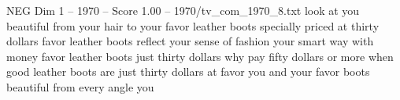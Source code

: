 \begin{textsample}{NEG Dim 1 – 1970 – Score 1.00 – 1970/tv\_com\_1970\_8.txt}  \label{ex:f1_neg_067}
look at you beautiful from your hair to your favor leather boots specially priced at thirty dollars favor leather boots reflect your sense of fashion your smart way with money favor leather boots just thirty dollars why pay fifty dollars or more when good leather boots are just thirty dollars at favor you and your favor boots beautiful from every angle you

\end{textsample}
